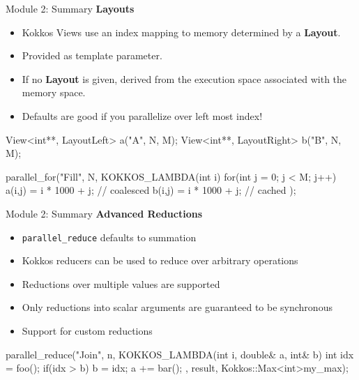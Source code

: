\begin{frame}[fragile]{Module 2: Summary}
	\textbf{Layouts}
	\begin{itemize}
		\item Kokkos Views use an index mapping to memory determined by a \textbf{Layout}.
		\item Provided as template parameter.
		\item If no \textbf{Layout} is given, derived from the execution space associated with the memory space.
		\item Defaults are good if you parallelize over left most index!
	\end{itemize}

\begin{code}[keywords={View,int,CudaSpace}]
	View<int**, LayoutLeft> a("A", N, M);
	View<int**, LayoutRight> b("B", N, M);

	parallel_for("Fill", N, KOKKOS_LAMBDA(int i) {
          for(int j = 0; j < M; j++) {
            a(i,j) = i * 1000 + j; // coalesced
	    b(i,j) = i * 1000 + j; // cached
          }
	});
\end{code}

\end{frame}

\begin{frame}[fragile]{Module 2: Summary}
	\textbf{Advanced Reductions}
	\begin{itemize}
        \item \texttt{parallel\_reduce} defaults to summation
        \item Kokkos reducers can be used to reduce over arbitrary operations
        \item Reductions over multiple values are supported
        \item Only reductions into scalar arguments are guaranteed to be synchronous
        \item Support for custom reductions
	\end{itemize}

\begin{code}[keywords={View,int,CudaSpace}]
    parallel_reduce("Join", n,
      KOKKOS_LAMBDA(int i, double& a, int& b) {
        int idx = foo();
        if(idx > b) b = idx;
        a += bar();
      }, result, Kokkos::Max<int>{my_max});
\end{code}

\end{frame}

